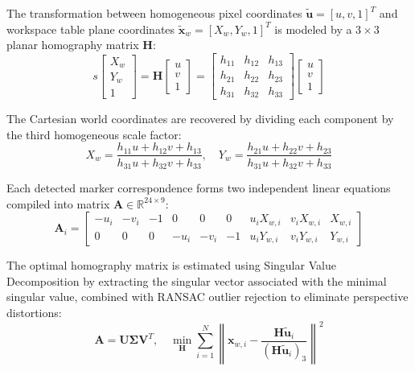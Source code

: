 \documentclass[runningheads]{llncs}
\begin{document}
The transformation between homogeneous pixel coordinates $\tilde{\mathbf{u}} = [u, v, 1]^T$ and workspace table plane coordinates $\tilde{\mathbf{x}}_w = [X_w, Y_w, 1]^T$ is modeled by a $3 \times 3$ planar homography matrix $\mathbf{H}$:
\begin{equation}
    s \begin{bmatrix} X_w \\ Y_w \\ 1 \end{bmatrix} = \mathbf{H} \begin{bmatrix} u \\ v \\ 1 \end{bmatrix} = \begin{bmatrix} h_{11} & h_{12} & h_{13} \\ h_{21} & h_{22} & h_{23} \\ h_{31} & h_{32} & h_{33} \end{bmatrix} \begin{bmatrix} u \\ v \\ 1 \end{bmatrix}
\end{equation}

The Cartesian world coordinates are recovered by dividing each component by the third homogeneous scale factor:
\begin{equation}
    X_w = \frac{h_{11}u + h_{12}v + h_{13}}{h_{31}u + h_{32}v + h_{33}}, \quad Y_w = \frac{h_{21}u + h_{22}v + h_{23}}{h_{31}u + h_{32}v + h_{33}}
\end{equation}

Each detected marker correspondence forms two independent linear equations compiled into matrix $\mathbf{A} \in \mathbb{R}^{24 \times 9}$:
\begin{equation}
    \mathbf{A}_i = \begin{bmatrix} -u_i & -v_i & -1 & 0 & 0 & 0 & u_i X_{w,i} & v_i X_{w,i} & X_{w,i} \\ 0 & 0 & 0 & -u_i & -v_i & -1 & u_i Y_{w,i} & v_i Y_{w,i} & Y_{w,i} \end{bmatrix}
\end{equation}

The optimal homography matrix is estimated using Singular Value Decomposition by extracting the singular vector associated with the minimal singular value, combined with RANSAC outlier rejection to eliminate perspective distortions:
\begin{equation}
    \mathbf{A} = \mathbf{U} \mathbf{\Sigma} \mathbf{V}^T, \quad \min_{\mathbf{H}} \sum_{i=1}^N \left\| \mathbf{x}_{w,i} - \frac{\mathbf{H} \tilde{\mathbf{u}}_i}{(\mathbf{H} \tilde{\mathbf{u}}_i)_3} \right\|^2
\end{equation}
\end{document}
